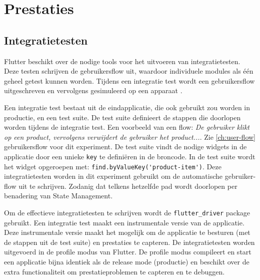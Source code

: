 \section{Prestaties}
\label{ch:prestaties}
\subsection{Integratietesten}
Flutter beschikt over de nodige tools voor het uitvoeren van integratietesten. Deze testen schrijven de gebruikersflow uit, waardoor individuele modules als één geheel getest kunnen worden. Tijdens een integratie test wordt een gebruikersflow uitgeschreven en vervolgens gesimuleerd op een apparaat \autocite{Flutter2019b}. 

Een integratie test bestaat uit de eindapplicatie, die ook gebruikt zou worden in productie, en een test suite. De test suite definieert de stappen die doorlopen worden tijdens de integratie test. Een voorbeeld van een flow: \textit{De gebruiker klikt op een product, vervolgens verwijdert de gebruiker het product...}. Zie \ref{ch:user-flow} gebruikersflow voor dit experiment. De test suite vindt de nodige widgets in de applicatie door een unieke \verb|key| te definiëren in de broncode. In de test suite wordt het widget opgeroepen met: \verb|find.byValueKey('product-item')|. \newline
Deze integratietesten worden in dit experiment gebruikt om de automatische gebruiker-flow uit te schrijven. Zodanig dat telkens hetzelfde pad wordt doorlopen per benadering van State Management.

Om de effectieve integratietesten te schrijven wordt de \verb|flutter_driver| package gebruikt.
Een integratie test maakt een instrumentale versie van de applicatie. Deze instrumentale versie maakt het mogelijk om de applicatie te besturen (met de stappen uit de test suite) en prestaties te capteren.
De integratietesten worden uitgevoerd in de profile modus van Flutter. De profile modus compileert en start een applicatie bijna identiek als de release mode (productie) en beschikt over de extra functionaliteit om prestatieproblemen te capteren en te debuggen.

